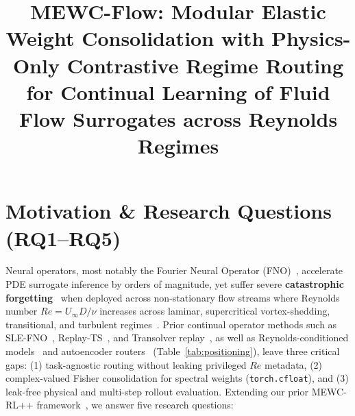 \documentclass[11pt,a4paper]{article}
\title{\large\textbf{MEWC-Flow: Modular Elastic Weight Consolidation with Physics-Only Contrastive Regime Routing for Continual Learning of Fluid Flow Surrogates across Reynolds Regimes}}
\date{}
\begin{document}
\maketitle

\bigskip

\section{Motivation \& Research Questions (RQ1--RQ5)}

Neural operators, most notably the Fourier Neural Operator (FNO)~\cite{li2021fno}, accelerate PDE surrogate inference by orders of magnitude, yet suffer severe \textbf{catastrophic forgetting}~\cite{kirkpatrick2017ewc} when deployed across non-stationary flow streams where Reynolds number $Re = U_{\infty} D / \nu$ increases across laminar, supercritical vortex-shedding, transitional, and turbulent regimes~\cite{shi2026striding,winkler2026nfl}. Prior continual operator methods such as SLE-FNO~\cite{elhadidy2026slefno}, Replay-TS~\cite{hemati2026replayts}, and Transolver replay~\cite{wang2026replay}, as well as Reynolds-conditioned models~\cite{guo2026renanet} and autoencoder routers~\cite{ji2026pmoe,kim2026mgann} (Table~\ref{tab:positioning}), leave three critical gaps: (1) task-agnostic routing without leaking privileged $Re$ metadata, (2) complex-valued Fisher consolidation for spectral weights (\texttt{torch.cfloat}), and (3) leak-free physical and multi-step rollout evaluation. Extending our prior MEWC-RL++ framework~\cite{hasan2026mewcrlpp}, we answer five research questions:
\end{document}
